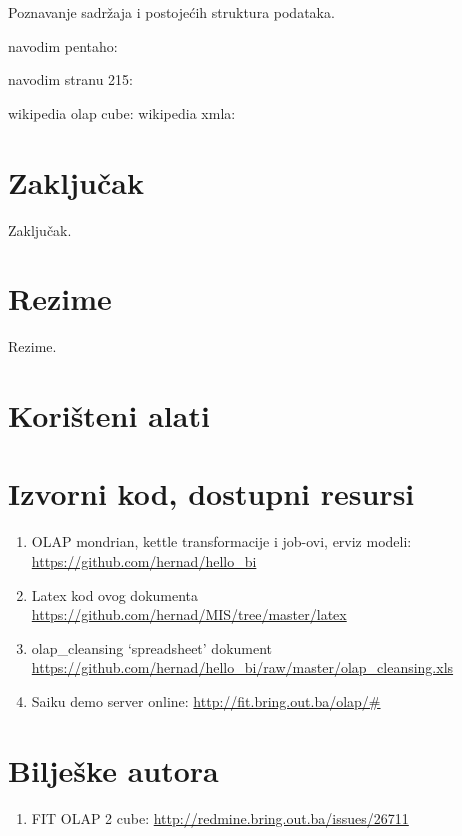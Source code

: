 \documentclass[times, utf8, seminar]{fit}
\begin{document}
Poznavanje sadržaja i postojećih struktura podataka.





navodim pentaho: \cite{pentaho32}

navodim stranu 215: \cite[str.~215]{pentaho32}

wikipedia olap cube: \cite{web:wikipedia:olap_cube}
wikipedia xmla: \cite{web:wikipedia:xmla}

\chapter{Zaključak}
Zaključak.




\chapter{Rezime}
Rezime.

\appendix

\chapter{Korišteni alati}

\chapter{Izvorni kod, dostupni resursi}
\label{chap:izvorni_kod}

\begin{enumerate}[labelindent=\parindent,leftmargin=*]
   \item OLAP mondrian, kettle transformacije i job-ovi, erviz modeli: \url{https://github.com/hernad/hello_bi}
   \item Latex kod ovog dokumenta \url{https://github.com/hernad/MIS/tree/master/latex}
   \item olap\_cleansing `spreadsheet' dokument \url{https://github.com/hernad/hello_bi/raw/master/olap_cleansing.xls}
   \item Saiku demo server online: \url{http://fit.bring.out.ba/olap/#}
\end{enumerate}

\chapter{Bilješke autora}

\begin{enumerate}
  \item FIT OLAP 2 cube: \url{http://redmine.bring.out.ba/issues/26711}
\end{enumerate}
\end{document}
